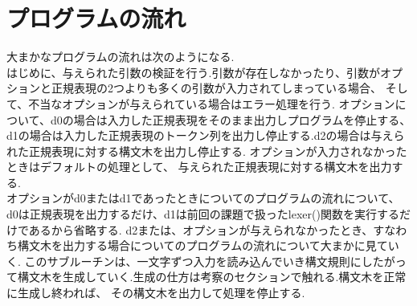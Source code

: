\documentclass{jsarticle}
\theoremstyle{plain}
\begin{document}
\section{プログラムの流れ}
大まかなプログラムの流れは次のようになる. \\
はじめに、与えられた引数の検証を行う.引数が存在しなかったり、引数がオプションと正規表現の2つよりも多くの引数が入力されてしまっている場合、
そして、不当なオプションが与えられている場合はエラー処理を行う. オプションについて、d0の場合は入力した正規表現をそのまま出力しプログラムを停止する、
d1の場合は入力した正規表現のトークン列を出力し停止する.d2の場合は与えられた正規表現に対する構文木を出力し停止する. オプションが入力されなかったときはデフォルトの処理として、
与えられた正規表現に対する構文木を出力する. \\
オプションがd0またはd1であったときについてのプログラムの流れについて、d0は正規表現を出力するだけ、d1は前回の課題で扱ったlexer()関数を実行するだけであるから省略する.
d2または、オプションが与えられなかったとき、すなわち構文木を出力する場合についてのプログラムの流れについて大まかに見ていく.
このサブルーチンは、一文字ずつ入力を読み込んでいき構文規則にしたがって構文木を生成していく.生成の仕方は考察のセクションで触れる.構文木を正常に生成し終われば、
その構文木を出力して処理を停止する.
\end{document}
